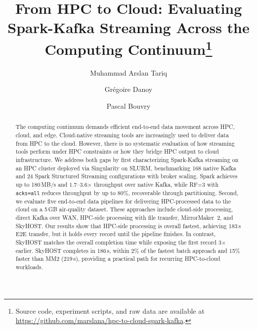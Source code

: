 \documentclass[runningheads]{llncs}
\begin{document}
\title{From HPC to Cloud: Evaluating Spark-Kafka Streaming Across the Computing Continuum\thanks{Source code, experiment scripts, and raw data are available at \url{https://github.com/marslana/hpc-to-cloud-spark-kafka}.}}


\author{Muhammad Arslan Tariq \and
Gr\'{e}goire Danoy \and
Pascal Bouvry}



\maketitle

\begin{abstract}

The computing continuum demands efficient end-to-end data movement across HPC, cloud, and edge. Cloud-native streaming tools are increasingly used to deliver data from HPC to the cloud. However, there is no systematic evaluation of how streaming tools perform under HPC constraints or how they bridge HPC output to cloud infrastructure. We address both gaps by first characterizing Spark-Kafka streaming on an HPC cluster deployed via Singularity on SLURM, benchmarking 168 native Kafka and 24 Spark Structured Streaming configurations with broker scaling. Spark achieves up to 180\,MB/s and 1.7--3.6$\times$ throughput over native Kafka, while RF=3 with \texttt{acks=all} reduces throughput by up to 80\%, recoverable through partitioning. Second, we evaluate five end-to-end data pipelines for delivering HPC-processed data to the cloud on a 5\,GB air-quality dataset. These approaches include cloud-side processing, direct Kafka over WAN, HPC-side processing with file transfer, MirrorMaker~2, and SkyHOST. Our results show that HPC-side processing is overall fastest, achieving 183\,s E2E transfer, but it holds every record until the pipeline finishes. In contrast, SkyHOST matches the overall completion time while exposing the first record 3$\times$ earlier. SkyHOST completes in 186\,s, within 2\% of the fastest batch approach and 15\% faster than MM2 (219\,s), providing a practical path for recurring HPC-to-cloud workloads.


\end{abstract}
\end{document}
